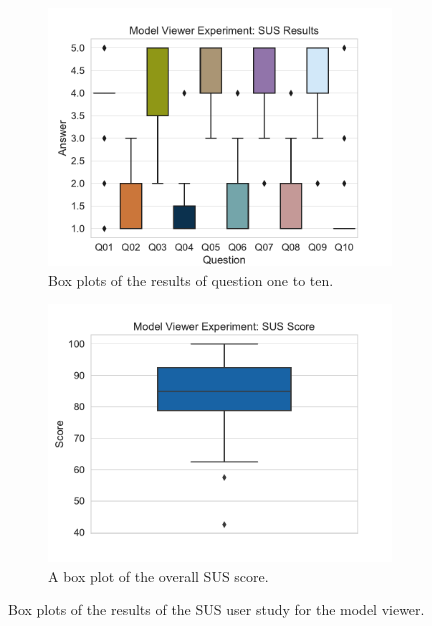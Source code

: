 \begin{figure}[H]
	\centering
	\begin{subfigure}[t]{.48\linewidth}%
		\centering
		\includegraphics[width=\linewidth]{figures/evaluation/res_exp_mv.pdf}
		\caption{Box plots of the results of question one to ten.}\label{fig:res-exp-mv}
	\end{subfigure}%
	\hspace{0.03\linewidth}%
	\begin{subfigure}[t]{.48\linewidth}%
		\centering
		\includegraphics[width=\linewidth]{figures/evaluation/score_exp_mv.pdf}
		\caption{A box plot of the overall \gls{SUS} score.}\label{fig:score-exp-mv}
	\end{subfigure}%
	\caption[Model viewer SUS results]{Box plots of the results of the \gls{SUS} user study for the model viewer.}\label{fig:exp-mv-stats}
\end{figure}

